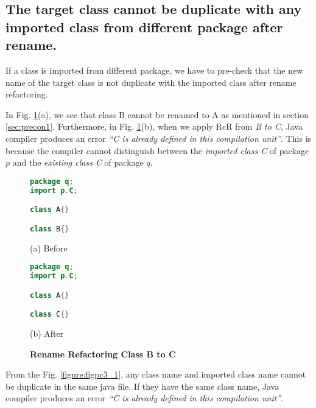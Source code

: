 \subsection{The target class cannot be duplicate with any imported class from different package after rename.}

If a class is imported from different package, we have to pre-check that the new name of the target class is not duplicate with the imported class after rename refactoring. 

In Fig. \ref{figure:fig2}(a), we see that class B cannot be renamed to A as mentioned in section \ref{sec:precon1}. Furthermore, in Fig. \ref{figure:fig2}(b), when we apply RcR from \emph{B to C}, Java compiler produces an error \textit{``C is already defined in this compilation unit''}. This is because the compiler cannot distinguish between the \emph{imported class C} of package $p$ and the \emph{existing class C} of package $q$. 

\begin{figure}[th]
\centering
\begin{minipage}[t]{0.4\linewidth}
\begin{lstlisting}[language=java, basicstyle=\scriptsize\ttfamily,frame=single]
package q;
import p.C;

class A{}

class B{} 
\end{lstlisting}
\centering(a) Before
\end{minipage}
\hfill
\begin{minipage}[t]{0.4\linewidth}
\begin{lstlisting}[language=java, basicstyle=\scriptsize\ttfamily,frame=single]
package q;
import p.C;

class A{}

class C{} 
\end{lstlisting}
\centering(b) After
\end{minipage}
\caption{\textbf{Rename Refactoring Class B to C}}
\label{figure:fig2}
\end{figure}


From the Fig. \ref{figure:figpc3_1}, any class name and imported class name cannot be duplicate in the same java file. If they have the same class name, Java compiler produces an error \textit{``C is already defined in this compilation unit''}.  

